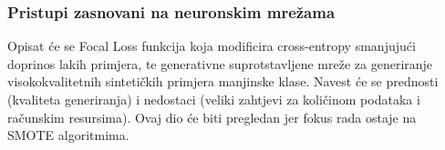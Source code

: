 \subsubsection{Pristupi zasnovani na neuronskim mre\v{z}ama}

Opisat \'{c}e se Focal Loss funkcija \cite{lin2017} koja modificira
cross-entropy smanjuju\'{c}i doprinos lakih primjera, te generativne
suprotstavljene mre\v{z}e \cite{goodfellow2014} za generiranje
visokokvalitetnih sinteti\v{c}kih primjera manjinske klase. Navest
\'{c}e se prednosti (kvaliteta generiranja) i nedostaci (veliki zahtjevi
za koli\v{c}inom podataka i ra\v{c}unskim resursima). Ovaj dio \'{c}e biti
pregledan jer fokus rada ostaje na SMOTE algoritmima.
